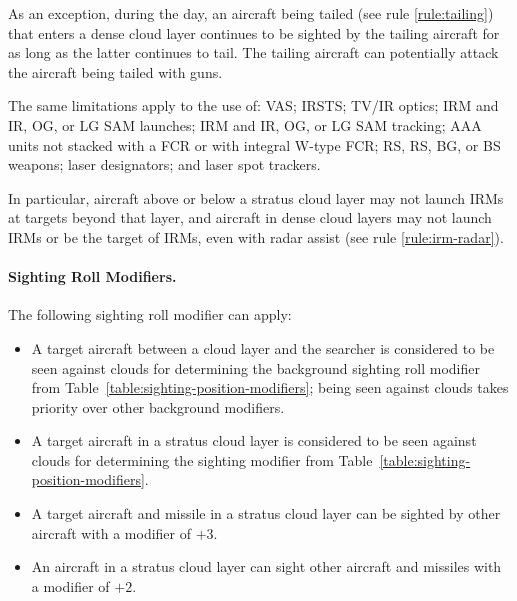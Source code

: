\begin{advancedrules}
{As an exception, during the day, an aircraft being tailed (see rule \ref{rule:tailing}) that enters a dense cloud layer continues to be sighted by the tailing aircraft for as long as the latter continues to tail. The tailing aircraft can potentially attack the aircraft being tailed with guns.

The same limitations apply to the use of: VAS; IRSTS; TV/IR optics; IRM and IR, OG, or LG SAM launches; IRM and IR, OG, or LG SAM tracking; AAA units not stacked with a FCR or with integral W-type FCR; RS, RS, BG, or BS weapons; laser designators; and laser spot trackers. 

In particular, aircraft above or below a stratus cloud layer may not launch IRMs at targets beyond that layer, and aircraft in dense cloud layers may not launch IRMs or be the target of IRMs, even with radar assist (see rule \ref{rule:irm-radar}).

\paragraph{Sighting Roll Modifiers.} The following sighting roll modifier can apply:

\begin{itemize}

\item A target aircraft between a cloud layer and the searcher is considered to be seen against clouds for determining the background sighting roll modifier from Table~\ref{table:sighting-position-modifiers}; being seen against clouds takes priority over other background modifiers.

\item A target aircraft in a stratus cloud layer is considered to be seen against clouds for determining the sighting modifier from Table~\ref{table:sighting-position-modifiers}.

\item A target aircraft and missile in a stratus cloud layer can be sighted by other aircraft with a modifier of $+3$. 

\item An aircraft in a stratus cloud layer can sight other aircraft and missiles with a modifier of $+2$.


\end{itemize}

}
\end{advancedrules}
